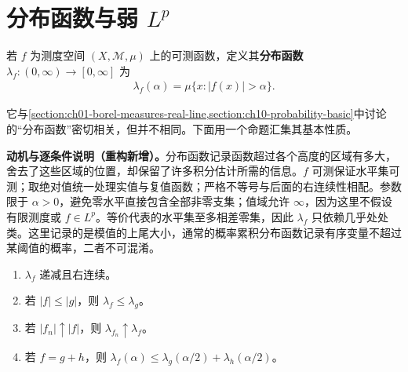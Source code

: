 \documentclass[../../main.tex]{subfiles}
\begin{document}
\section{分布函数与弱 $L^p$}\label{section:ch06-distribution-weak-lp}
\begin{definition}[分布函数]\label{definition:ch06-distribution-function}
若 $f$ 为测度空间 $(X,\mathscr M,\mu)$ 上的可测函数，定义其\textbf{分布函数} $\lambda_f:(0,\infty)\to[0,\infty]$ 为
\begin{align*}
\lambda_f(\alpha)=\mu\{x:|f(x)|>\alpha\}.
\end{align*}
\end{definition}
它与\cref{section:ch01-borel-measures-real-line,section:ch10-probability-basic}中讨论的“分布函数”密切相关，但并不相同。下面用一个命题汇集其基本性质。
\begin{remark}
\textbf{动机与逐条件说明（重构新增）。}分布函数记录函数超过各个高度的区域有多大，舍去了这些区域的位置，却保留了许多积分估计所需的信息。$f$ 可测保证水平集可测；取绝对值统一处理实值与复值函数；严格不等号与后面的右连续性相配。参数限于 $\alpha>0$，避免零水平直接包含全部非零支集；值域允许 $\infty$，因为这里不假设有限测度或 $f\in L^p$。等价代表的水平集至多相差零集，因此 $\lambda_f$ 只依赖几乎处处类。这里记录的是模值的上尾大小，通常的概率累积分布函数记录有序变量不超过某阈值的概率，二者不可混淆。
\end{remark}
\begin{proposition}\label{proposition:ch06-distribution-properties}
\begin{enumerate}
\item\label{item:ch06-distribution-right-continuous} $\lambda_f$ 递减且右连续。
\item\label{item:ch06-distribution-order} 若 $|f|\leqslant|g|$，则 $\lambda_f\leqslant\lambda_g$。
\item\label{item:ch06-distribution-monotone-limit} 若 $|f_n|\uparrow|f|$，则 $\lambda_{f_n}\uparrow\lambda_f$。
\item\label{item:ch06-distribution-sum} 若 $f=g+h$，则 $\lambda_f(\alpha)\leqslant\lambda_g(\alpha/2)+\lambda_h(\alpha/2)$。
\end{enumerate}
\end{proposition}
\end{document}
